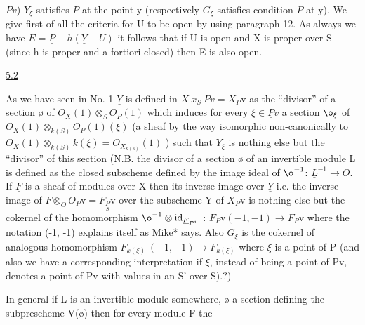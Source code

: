 
$\underline{P}v$) $Y_{\xi}$ satisfies $\underline{P}$ at the point y (respectively $G_{\xi}$ satisfies
condition $\underline{P}$ at y).  We give first of all the criteria for U to be
open by using paragraph 12.  As always we have $E = \underline{P} - h(\underline{Y} - U)$ it
follows that if U is open and X is proper over S (since h is
proper and a fortiori closed) then E is also open.

\uline{5.2}

As we have seen in No. 1 $\underline{Y}$ is defined in $X\ x_S\ Pv = X_P\mathrm{v}$ as the
``divisor'' of a section {\o} of $O_X(1) \otimes_S O_P(1)$ which induces for every
$\xi \in \underline{P}v$ a section ${\o}_{\xi}$ of $O_X(1) \otimes_{k(S)} O_P(1)(\xi)$ (a sheaf by the way
isomorphic non-canonically to $O_X(1) \otimes_{k(S)} k(\xi) = O_{X_{k(s)}}(1)$ )
such that $Y_{\xi}$ is nothing else but the ``divisor'' of this section
(N.B. the divisor of a section {\o} of an invertible module L is
defined as the closed subscheme defined by the image ideal of
${\o}^{-1}$: $\underline{L}^{-1} \to O$.  If $\underline{F}$ is a sheaf of modules over X then its inverse
image over $\underline{Y}$ i.e. the inverse image of $F \otimes_O O_P\mathrm{v} = F_{\underset{S}{P}}\mathrm{v}$ over
the subscheme Y of $X_P\mathrm{v}$ is nothing else but the cokernel of the
homomorphism ${\o}^{-1} \otimes \mathrm{id}_{\underline{F}_{P^v}}$ : $F_P\mathrm{v}(-1, -1) \to F_P\mathrm{v}$ where the
notation (-1, -1) explains itself as Mike* says.  Also $G_{\xi}$ is the
cokernel of analogous homomorphism $F_{k(\xi)}\ (-1, -1) \to F_{k(\xi)}$ where $\xi$ is
a point of P (and also we have a corresponding interpretation if $\xi$,
instead of being a point of Pv, denotes a point of Pv with values
in an S' over S).?)

In general if L is an invertible module somewhere, {\o} a
section defining the subprescheme V({\o}) then for every module F the
